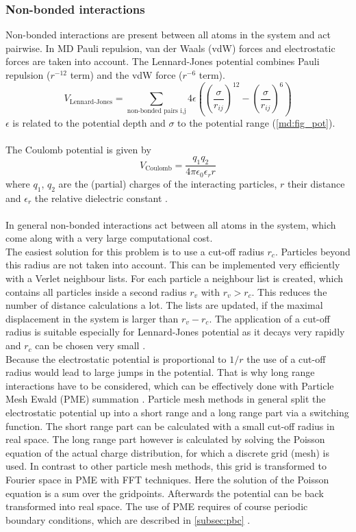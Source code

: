 \subsubsection{Non-bonded interactions}
Non-bonded interactions are present between all atoms in the system and act pairwise. In MD Pauli repulsion, van der Waals (vdW) forces and electrostatic forces are taken into account.
The Lennard-Jones potential combines Pauli repulsion ($r^{-12}$ term) and the vdW force ($r^{-6}$ term).
\begin{equation}
V_\text{Lennard-Jones} = \sum_{\text{non-bonded pairs i,j}} 4 \epsilon\left(\left(\frac{\sigma}{r_{ij}}\right)^{12} - \left(\frac{\sigma}{r_{ij}}\right)^6\right)
\end{equation}
$\epsilon$ is related to the potential depth and $\sigma$ to the potential range (\autoref{md:fig_pot}).\\
\\
The Coulomb potential is given by
\begin{equation}
V_\text{Coulomb} = \frac{q_1 q_2}{4 \pi \epsilon_0 \epsilon_r r}
\end{equation}
where $q_1$, $q_2$ are the (partial) charges of the interacting particles, $r$ their distance and $\epsilon_r$ the relative dielectric constant \autocite[p. 65-71]{gromacsManual}.\\
\\
In general non-bonded interactions act between all atoms in the system, which come along with a very large computational cost.\\
The easiest solution for this problem is to use a cut-off radius $r_c$. Particles beyond this radius are not taken into account. This can be implemented very efficiently with a Verlet neighbour lists. For each particle a neighbour list is created, which contains all particles inside a second radius $r_v$ with $r_v > r_c$. This reduces the number of distance calculations a lot. The lists are updated, if the maximal displacement in the system is larger than $r_v - r_c$.  The application of a cut-off radius is suitable especially for Lennard-Jones potential as it decays very rapidly and $r_c$ can be chosen very small \autocite[p. 144]{greenBook}.\\
Because the electrostatic potential is proportional to $1/r$ the use of a cut-off radius would lead to large jumps in the potential. That is why long range interactions have to be considered, which can be effectively done with Particle Mesh Ewald (PME) summation \autocite{pme}. Particle mesh methods in general split the electrostatic potential up into a short range and a long range part via a switching function. The short range part can be calculated with a small cut-off radius in real space. The long range part however is calculated by solving the Poisson equation of the actual charge distribution, for which a discrete grid (mesh) is used. In contrast to other particle mesh methods, this grid is transformed to Fourier space in PME with FFT techniques. Here the solution of the Poisson equation is a sum over the gridpoints. Afterwards the potential can be back transformed into real space. The use of PME requires of course periodic boundary conditions, which are described in \autoref{subsec:pbc} \autocite[p. 246-251]{greenBook}.
